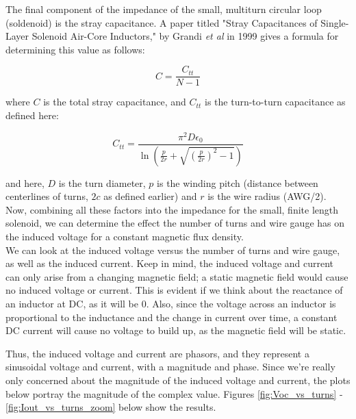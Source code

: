 \documentclass[12pt,onecolumn,titlepage]{article}
\begin{document}
The final component of the impedance of the small, multiturn circular loop (soldenoid) is the stray capacitance. A paper titled "Stray Capacitances of Single-Layer Solenoid Air-Core Inductors," by Grandi {\emph{et al}} in 1999 gives a formula for determining this value as follows:

\[C = \frac{C_{tt}}{N-1} \]

where $C$ is the total stray capacitance, and $C_{tt}$ is the turn-to-turn capacitance as defined here:

\[ C_{tt} = \frac{\pi^2 D \epsilon_0}{\ln \left( \frac{p}{2r} + \sqrt{ \left( \frac{p}{2r} \right)^2 - 1 } \right) } \]

and here, $D$ is the turn diameter, $p$ is the winding pitch (distance between centerlines of turns, $2c$ as defined earlier) and $r$ is the wire radius (AWG/2). \\

Now, combining all these factors into the impedance for the small, finite length solenoid, we can determine the effect the number of turns and wire gauge has on the induced voltage for a constant magnetic flux density. \\

We can look at the induced voltage versus the number of turns and wire gauge, as well as the induced current. Keep in mind, the induced voltage and current can only arise from a changing magnetic field; a static magnetic field would cause no induced voltage or current. This is evident if we think about the reactance of an inductor at DC, as it will be 0. Also, since the voltage across an inductor is proportional to the inductance and the change in current over time, a constant DC current will cause no voltage to build up, as the magnetic field will be static.

Thus, the induced voltage and current are phasors, and they represent a sinusoidal voltage and current, with a magnitude and phase. Since we're really only concerned about the magnitude of the induced voltage and current, the plots below portray the magnitude of the complex value. Figures \ref{fig:Voc_vs_turns} - \ref{fig:Iout_vs_turns_zoom} below show the results.
\end{document}

